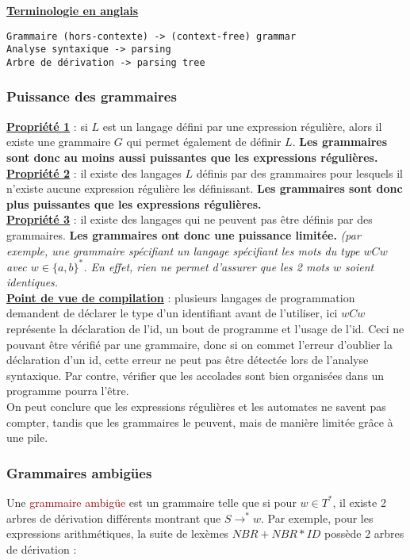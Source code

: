 \documentclass{article}
\newcommand{\red}[1]{\textcolor{darkred}{#1}}
\newcommand{\stitre}[1]{\noindent\textbf{\underline{#1}}}
\begin{document}
\stitre{Terminologie en anglais}
\begin{verbatim}
Grammaire (hors-contexte) -> (context-free) grammar
Analyse syntaxique -> parsing
Arbre de dérivation -> parsing tree
\end{verbatim}

\subsubsection{Puissance des grammaires}

\stitre{Propriété 1} : si $L$ est un langage défini par une expression régulière, alors il existe une grammaire $G$ qui permet également de définir $L$. \textbf{Les grammaires 
sont donc au moins aussi puissantes que les expressions régulières.} \\
\stitre{Propriété 2} : il existe des langages $L$ définis par des grammaires pour lesquels il n'existe aucune expression régulière les définissant. \textbf{Les grammaires sont donc 
plus puissantes que les expressions régulières.} \\
\stitre{Propriété 3} : il existe des langages qui ne peuvent pas être définis par des grammaires. \textbf{Les grammaires ont donc une puissance limitée.} \textit{(par exemple, une 
grammaire spécifiant un langage spécifiant les mots du type $wCw$ avec $w\in \{a,b\}^*$. En effet, rien ne permet d'assurer que les 2 mots $w$ soient identiques.} \\

\noindent \textbf{\underline{Point de vue de compilation}} : plusieurs langages de programmation demandent de déclarer le type d'un identifiant avant de l'utiliser, ici $wCw$ 
représente la déclaration de l'id, un bout de programme et l'usage de l'id. Ceci ne pouvant être vérifié par une grammaire, donc si on commet l'erreur d'oublier la déclaration d'un 
id, cette erreur ne peut pas être détectée lors de l'analyse syntaxique. Par contre, vérifier que les accolades sont bien organisées dans un programme pourra l'être. \\

On peut conclure que les expressions régulières et les automates ne savent pas compter, tandis que les grammaires le peuvent, mais de manière limitée grâce à une pile.
\newpage
\subsubsection{Grammaires ambigües}

Une \red{grammaire ambigüe} est un grammaire telle que si pour $w \in T^*$, il existe 2 arbres de dérivation différents montrant que $S\rightarrow^*w$. Par exemple, pour les 
expressions arithmétiques, la suite de lexèmes $NBR+NBR*ID$ possède 2 arbres de dérivation : \\
\end{document}
